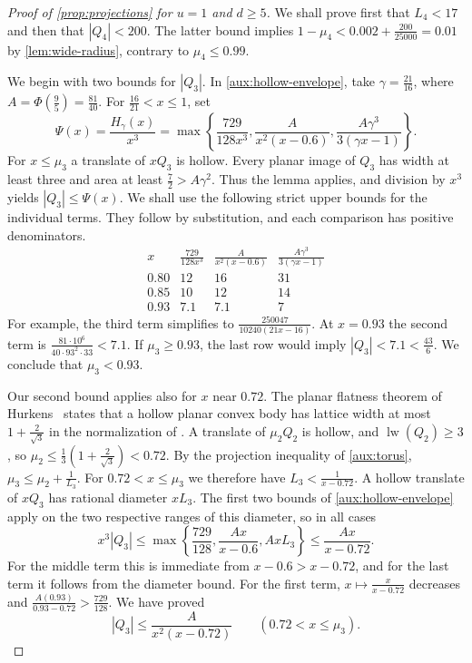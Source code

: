 \documentclass[reqno, 11pt]{article}
\numberwithin{equation}{section}
\theoremstyle{definition}
\DeclareMathOperator{\lw}{lw}
\begin{document}
\begin{proof}[Proof of \cref{prop:projections} for $u=1$ and $d\ge5$]
We shall prove first that $L_4<17$ and then that $|Q_4|<200$. The latter
bound implies $1-\mu_4<0.002+\frac{200}{25000}=0.01$ by
\cref{lem:wide-radius}, contrary to $\mu_4\le0.99$.

We begin with two bounds for $|Q_3|$. In \cref{aux:hollow-envelope},
take $\gamma=\frac{21}{16}$, where $A=\Phi(\frac{9}{5})=\frac{81}{40}$.
For $\frac{16}{21}<x\le1$, set
\[
 \Psi(x)=\frac{H_\gamma(x)}{x^3}
  =\max\left\{\frac{729}{128x^3},\frac{A}{x^2(x-0.6)},
                         \frac{A\gamma^3}{3(\gamma x-1)}\right\}.
\]
For $x\le\mu_3$ a translate of $xQ_3$ is hollow. Every planar image of
$Q_3$ has width at least three and area at least $\frac{7}{2}>A\gamma^2$.
Thus the lemma applies, and division by $x^3$ yields $|Q_3|\le\Psi(x)$.
We shall use the following strict upper bounds for the individual terms.
They follow by substitution, and each comparison has positive denominators.
\[
\begin{array}{c|ccc}
 x & \frac{729}{128x^3} & \frac{A}{x^2(x-0.6)}
   & \frac{A\gamma^3}{3(\gamma x-1)}\\ \hline
 0.80 & 12 & 16 & 31\\
 0.85 & 10 & 12 & 14\\
 0.93 & 7.1 & 7.1 & 7
\end{array}
\]
For example, the third term simplifies to $\frac{250047}{10240(21x-16)}$.
At $x=0.93$ the second term is
$\frac{81\cdot10^6}{40\cdot93^2\cdot33}<7.1$.
If $\mu_3\ge0.93$, the last row would imply $|Q_3|<7.1<\frac{43}{6}$.
We conclude that $\mu_3<0.93$.

Our second bound applies also for $x$ near $0.72$. The planar flatness
theorem of Hurkens~\cite{Hurkens} states that a hollow planar convex
body has lattice width at most $1+\frac{2}{\sqrt{3}}$ in the normalization
of \cite[Theorem~2.1]{AW}. A translate of $\mu_2Q_2$ is hollow, and
$\lw(Q_2)\ge3$, so
$\mu_2\le\frac{1}{3}(1+\frac{2}{\sqrt{3}})<0.72$.
By the projection inequality of \cref{aux:torus},
$\mu_3\le\mu_2+\frac{1}{L_3}$. For $0.72<x\le\mu_3$ we therefore have
$L_3<\frac{1}{x-0.72}$. A hollow translate of $xQ_3$ has rational
diameter $xL_3$. The first two bounds of \cref{aux:hollow-envelope}
apply on the two respective ranges of this diameter, so in all cases
\[
 x^3|Q_3|\le\max\left\{\frac{729}{128},\frac{Ax}{x-0.6},AxL_3\right\}
                   \le\frac{Ax}{x-0.72}.
\]
For the middle term this is immediate from $x-0.6>x-0.72$, and for
the last term it follows from the diameter bound. For the first term,
$x\mapsto\frac{x}{x-0.72}$ decreases and
$\frac{A(0.93)}{0.93-0.72}>\frac{729}{128}$. We have proved
\begin{equation}\label{eq:wide-flat-three}
 |Q_3|\le\frac{A}{x^2(x-0.72)}\qquad(0.72<x\le\mu_3).
\end{equation}


\end{proof}
\end{document}
